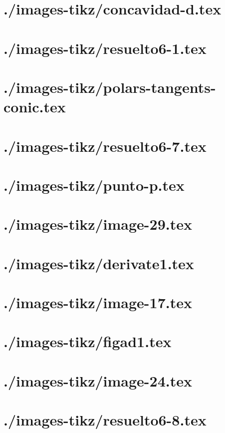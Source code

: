 \documentclass[]{article}
\begin{document}
\section{./images-tikz/concavidad-d.tex} 
\section{./images-tikz/resuelto6-1.tex} 
\section{./images-tikz/polars-tangents-conic.tex} 
\section{./images-tikz/resuelto6-7.tex} 
\section{./images-tikz/punto-p.tex} 
\section{./images-tikz/image-29.tex} 
\section{./images-tikz/derivate1.tex} 
\section{./images-tikz/image-17.tex} 
\section{./images-tikz/figad1.tex} 
\section{./images-tikz/image-24.tex} 
\section{./images-tikz/resuelto6-8.tex} 
\end{document}
